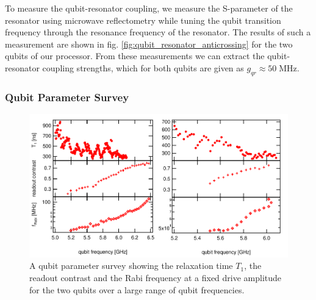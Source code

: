 To measure the qubit-resonator coupling, we measure the S-parameter of the resonator using microwave reflectometry while tuning the qubit transition frequency through the resonance frequency of the resonator. The results of such a measurement are shown in fig. \ref{fig:qubit_resonator_anticrossing} for the two qubits of our processor. From these measurements we can extract the qubit-resonator coupling strengths, which for both qubits are given as $g_{qr}\approx 50\;\mathrm{MHz}$.


\subsubsection{Qubit Parameter Survey}

\begin{figure}[ht!]
   \centering
	 \includegraphics[width=1\textwidth]{"./data/ct5/qubits - parameter surveys/qubit parameters"}
	 \caption[A qubit parameter survey showing $T_1$, readout contrast and Rabi frequency of the two qubits over a large range of qubit frequencies]{A qubit parameter survey showing the relaxation time $T_1$, the readout contrast and the Rabi frequency at a fixed drive amplitude for the two qubits over a large range of qubit frequencies.}
	 \label{fig:qubit_parameters}
\end{figure}

